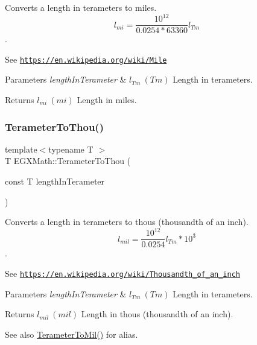 Converts a length in terameters to miles. \[ l_{mi}=\frac{10^{12}}{0.0254 * 63360} l_{Tm} \]. 

See \href{https://en.wikipedia.org/wiki/Mile}{\tt https\+://en.\+wikipedia.\+org/wiki/\+Mile} 
\begin{DoxyParams}{Parameters}
{\em length\+In\+Terameter} & $ l_{Tm}\ (Tm)$ Length in terameters. \\
\hline
\end{DoxyParams}
\begin{DoxyReturn}{Returns}
$ l_{mi}\ (mi)$ Length in miles. 
\end{DoxyReturn}
\mbox{\label{group___e_g_x_math-_conversions-_length_conversions-_s_i-_terameter-_imperial_ga3e00f52eb5c96d53031f36d7003a0e5e}} 
\subsubsection{\texorpdfstring{Terameter\+To\+Thou()}{TerameterToThou()}}
{\footnotesize\ttfamily template$<$typename T $>$ \\
T E\+G\+X\+Math\+::\+Terameter\+To\+Thou (\begin{DoxyParamCaption}\item[{const T}]{length\+In\+Terameter }\end{DoxyParamCaption})}



Converts a length in terameters to thous (thousandth of an inch). \[ l_{mil}= \frac{10^{12}}{0.0254} l_{Tm} * 10^{3} \]. 

See \href{https://en.wikipedia.org/wiki/Thousandth_of_an_inch}{\tt https\+://en.\+wikipedia.\+org/wiki/\+Thousandth\+\_\+of\+\_\+an\+\_\+inch} 
\begin{DoxyParams}{Parameters}
{\em length\+In\+Terameter} & $ l_{Tm}\ (Tm)$ Length in terameters. \\
\hline
\end{DoxyParams}
\begin{DoxyReturn}{Returns}
$ l_{mil}\ (mil)$ Length in thous (thousandth of an inch). 
\end{DoxyReturn}
\begin{DoxySeeAlso}{See also}
\mbox{\hyperlink{group___e_g_x_math-_conversions-_length_conversions-_s_i-_terameter-_imperial_ga9ae6fa58a9800d91e89f76e68838fa86}{Terameter\+To\+Mil()}} for alias. 
\end{DoxySeeAlso}
\mbox{\label{group___e_g_x_math-_conversions-_length_conversions-_s_i-_terameter-_imperial_ga4f3bcac82e02fddb21fedf80ec01275b}} 
